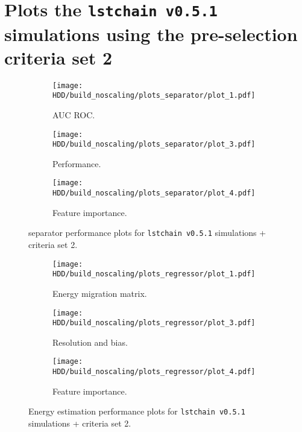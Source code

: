 \section{Plots the \texttt{lstchain v0.5.1} simulations using the pre-selection criteria set 2}
\begin{figure}
    \centering
    \begin{subfigure}{0.49\textwidth}
        \centering
        \texttt{[image: HDD/build\_noscaling/plots\_separator/plot\_1.pdf]}
        \caption{AUC ROC.}
        \label{fig:separator_oldMC_150_1}
    \end{subfigure}
    \hfill
    \begin{subfigure}{0.49\textwidth}
        \centering
        \texttt{[image: HDD/build\_noscaling/plots\_separator/plot\_3.pdf]}
        \caption{Performance.}
        \label{fig:separator_oldMC_150_2}
    \end{subfigure}
    \newline\vfill
    \begin{subfigure}{0.49\textwidth}
        \centering
        \texttt{[image: HDD/build\_noscaling/plots\_separator/plot\_4.pdf]}
        \caption{Feature importance.}
        \label{fig:separator_oldMC_150_feature}
    \end{subfigure}
    \caption{separator performance plots for \texttt{lstchain v0.5.1} simulations + criteria set 2.}
\end{figure}

\begin{figure}
    \centering
    \begin{subfigure}{0.49\textwidth}
        \centering
        \texttt{[image: HDD/build\_noscaling/plots\_regressor/plot\_1.pdf]}
        \caption{Energy migration matrix.}
    \end{subfigure}
    \hfill
    \begin{subfigure}{0.49\textwidth}
        \centering
        \texttt{[image: HDD/build\_noscaling/plots\_regressor/plot\_3.pdf]}
        \caption{Resolution and bias.}
    \end{subfigure}
    \newline\vfill
    \begin{subfigure}{0.49\textwidth}
        \centering
        \texttt{[image: HDD/build\_noscaling/plots\_regressor/plot\_4.pdf]}
        \caption{Feature importance.}
    \end{subfigure}
    \caption{Energy estimation performance plots for \texttt{lstchain v0.5.1} simulations + criteria set 2.}
    \label{fig:regressor_oldMC_150}
\end{figure}

